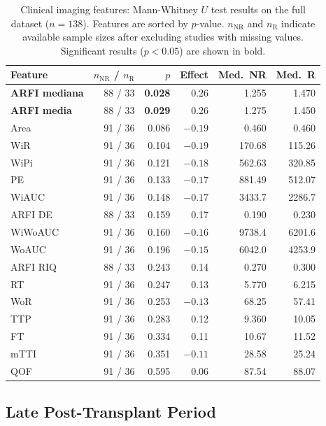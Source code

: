 \begin{table}[ht]
\centering
\caption{Clinical imaging features: Mann-Whitney $U$ test results on the full dataset ($n = 138$). Features are sorted by $p$-value. $n_{\text{NR}}$ and $n_{\text{R}}$ indicate available sample sizes after excluding studies with missing values. Significant results ($p < 0.05$) are shown in bold.}
\label{tab:clinical_full}
\small
\begin{tabular}{lrrrrr}
\toprule
Feature & $n_{\text{NR}}$ / $n_{\text{R}}$ & $p$ & Effect & Med.\ NR & Med.\ R \\
\midrule
\textbf{ARFI mediana} & 88 / 33 & \textbf{0.028} & 0.26 & 1.255 & 1.470 \\
\textbf{ARFI media} & 88 / 33 & \textbf{0.029} & 0.26 & 1.275 & 1.450 \\
Area & 91 / 36 & 0.086 & $-0.19$ & 0.460 & 0.460 \\
WiR & 91 / 36 & 0.104 & $-0.19$ & 170.68 & 115.26 \\
WiPi & 91 / 36 & 0.121 & $-0.18$ & 562.63 & 320.85 \\
PE & 91 / 36 & 0.133 & $-0.17$ & 881.49 & 512.07 \\
WiAUC & 91 / 36 & 0.148 & $-0.17$ & 3433.7 & 2286.7 \\
ARFI DE & 88 / 33 & 0.159 & 0.17 & 0.190 & 0.230 \\
WiWoAUC & 91 / 36 & 0.160 & $-0.16$ & 9738.4 & 6201.6 \\
WoAUC & 91 / 36 & 0.196 & $-0.15$ & 6042.0 & 4253.9 \\
ARFI RIQ & 88 / 33 & 0.243 & 0.14 & 0.270 & 0.300 \\
RT & 91 / 36 & 0.247 & 0.13 & 5.770 & 6.215 \\
WoR & 91 / 36 & 0.253 & $-0.13$ & 68.25 & 57.41 \\
TTP & 91 / 36 & 0.283 & 0.12 & 9.360 & 10.05 \\
FT & 91 / 36 & 0.334 & 0.11 & 10.67 & 11.52 \\
mTTI & 91 / 36 & 0.351 & $-0.11$ & 28.58 & 25.24 \\
QOF & 91 / 36 & 0.595 & 0.06 & 87.54 & 88.07 \\
\bottomrule
\end{tabular}
\end{table}

\subsection{Late Post-Transplant Period}

